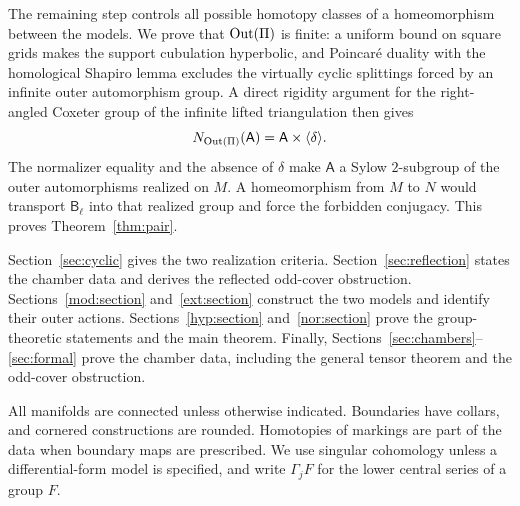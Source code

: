The remaining step controls all possible homotopy classes of a
homeomorphism between the models.  We prove that $\operatorname{Out}(\Pi)$ is finite:
a uniform bound on square grids makes the support cubulation
hyperbolic, and Poincar\'e duality with the homological Shapiro lemma
excludes the virtually cyclic splittings forced by an infinite outer
automorphism group.  A direct rigidity argument for the right-angled
Coxeter group of the infinite lifted triangulation then gives
\[
 N_{\operatorname{Out}(\Pi)}(\mathsf A)=\mathsf A\times\langle\delta\rangle.
\]
The normalizer equality and the absence of $\delta$ make
$\mathsf A$ a Sylow $2$-subgroup of the outer automorphisms realized on
$M$.  A homeomorphism from $M$ to $N$ would transport
$\mathsf B_\ell$ into that realized group and force the forbidden
conjugacy.  This proves Theorem~\ref{thm:pair}.

Section~\ref{sec:cyclic} gives the two realization criteria.
Section~\ref{sec:reflection} states the chamber data and derives the
reflected odd-cover obstruction.  Sections~\ref{mod:section}
and~\ref{ext:section} construct the two models and identify their
outer actions.  Sections~\ref{hyp:section} and~\ref{nor:section}
prove the group-theoretic statements and the main theorem.
Finally, Sections~\ref{sec:chambers}--\ref{sec:formal} prove the
chamber data, including the general tensor theorem and the odd-cover
obstruction.

All manifolds are connected unless otherwise indicated.  Boundaries
have collars, and cornered constructions are rounded.  Homotopies
of markings are part of the data when boundary maps are prescribed.
We use singular cohomology unless a differential-form model is
specified, and write $\Gamma_j F$ for the lower central series of
a group $F$.
